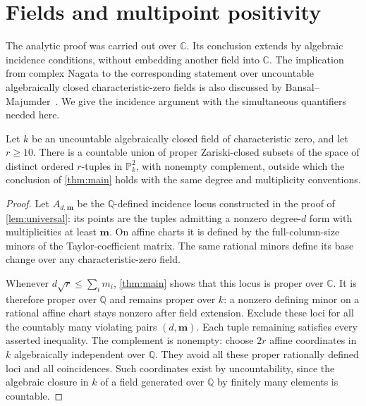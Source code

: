 \section{Fields and multipoint positivity}\label{sec:consequences}

The analytic proof was carried out over $\mathbb{C}$. Its conclusion extends by algebraic incidence conditions, without embedding another field into $\mathbb{C}$. The implication from complex Nagata to the corresponding statement over uncountable algebraically closed characteristic-zero fields is also discussed by Bansal--Majumder~\cite{BM2025}. We give the incidence argument with the simultaneous quantifiers needed here.

\begin{corollary}\label{cor:fields}
Let $k$ be an uncountable algebraically closed field of characteristic zero, and let $r\ge10$. There is a countable union of proper Zariski-closed subsets of the space of distinct ordered $r$-tuples in $\mathbb{P}^2_k$, with nonempty complement, outside which the conclusion of \cref{thm:main} holds with the same degree and multiplicity conventions.
\end{corollary}
\begin{proof}
Let $A_{d,\mathbf{m}}$ be the $\mathbb{Q}$-defined incidence locus constructed in the proof of \cref{lem:universal}: its points are the tuples admitting a nonzero degree-$d$ form with multiplicities at least $\mathbf{m}$. On affine charts it is defined by the full-column-size minors of the Taylor-coefficient matrix. The same rational minors define its base change over any characteristic-zero field.

Whenever $d\sqrt r\le\sum_i m_i$, \cref{thm:main} shows that this locus is proper over $\mathbb{C}$. It is therefore proper over $\mathbb{Q}$ and remains proper over $k$: a nonzero defining minor on a rational affine chart stays nonzero after field extension. Exclude these loci for all the countably many violating pairs $(d,\mathbf{m})$. Each tuple remaining satisfies every asserted inequality. The complement is nonempty: choose $2r$ affine coordinates in $k$ algebraically independent over $\mathbb{Q}$. They avoid all these proper rationally defined loci and all coincidences. Such coordinates exist by uncountability, since the algebraic closure in $k$ of a field generated over $\mathbb{Q}$ by finitely many elements is countable.
\end{proof}

